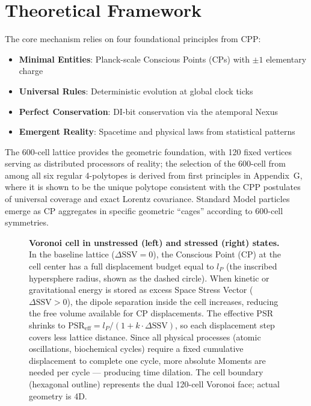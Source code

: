 \documentclass[11pt,letterpaper]{article}
\begin{document}
\section{Theoretical Framework}

The core mechanism relies on four foundational principles from CPP:
\begin{itemize}
    \item \textbf{Minimal Entities}: Planck-scale Conscious Points (CPs) with $\pm 1$ elementary charge
    \item \textbf{Universal Rules}: Deterministic evolution at global clock ticks
    \item \textbf{Perfect Conservation}: DI-bit conservation via the atemporal Nexus
    \item \textbf{Emergent Reality}: Spacetime and physical laws from statistical patterns
\end{itemize}

The 600-cell lattice provides the geometric foundation, with 120 fixed vertices serving as distributed processors of reality; the selection of the 600-cell from among all six regular 4-polytopes is derived from first principles in 
Appendix~G, where it is shown to be the unique polytope consistent with the CPP postulates of universal coverage and exact Lorentz covariance. Standard Model particles emerge as CP aggregates in specific geometric ``cages'' according to 
600-cell symmetries.



\begin{figure}[H]
  \centering
  
  \caption{%
    \textbf{Voronoi cell in unstressed (left) and stressed (right) states.}
    In the baseline lattice ($\Delta\text{SSV} = 0$), the Conscious Point (CP)
    at the cell center has a full displacement budget equal to $l_P$ (the
    inscribed hypersphere radius, shown as the dashed circle). When kinetic or
    gravitational energy is stored as excess Space Stress Vector ($\Delta\text{SSV} > 0$),
    the dipole separation inside the cell increases, reducing the free volume
    available for CP displacements. The effective PSR shrinks to
    $\text{PSR}_{\text{eff}} = l_P/(1 + k\cdot\Delta\text{SSV})$,
    so each displacement step covers less lattice distance. Since all physical
    processes (atomic oscillations, biochemical cycles) require a fixed
    cumulative displacement to complete one cycle, more absolute Moments are
    needed per cycle — producing time dilation. The cell boundary (hexagonal
    outline) represents the dual 120-cell Voronoi face; actual geometry is 4D.
  }
  \label{fig:voronoi}
\end{figure}
\end{document}
